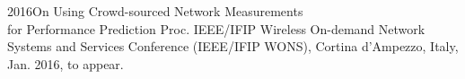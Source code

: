 \documentclass[]{friggeri-cv}
\begin{document}
	\begin{entrylist}
	\entry
	{2016}{On Using Crowd-sourced Network Measurements \\for Performance
	Prediction}{ }
	{Proc. IEEE/IFIP Wireless On-demand Network Systems and Services Conference (IEEE/IFIP WONS), Cortina d'Ampezzo, Italy, Jan. 2016, to appear.}
	\end{entrylist}


	
\end{document}
